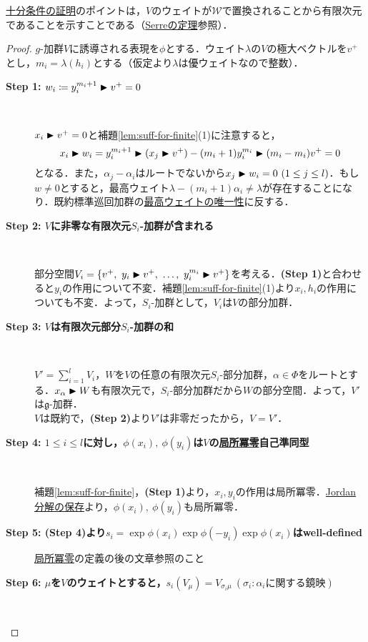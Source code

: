 \documentclass[rep_main]{subfiles}
\begin{document}
\hyperref[thm:suff-for-finite]{十分条件の証明}のポイントは，$V$のウェイトが$\mathscr{W}$で置換されることから有限次元であることを示すことである（\hyperref[thm:Serre]{Serreの定理}参照）．
\begin{proof}
	$g$-加群$V$に誘導される表現を$\phi$とする．ウェイト$\lambda$の$V$の極大ベクトルを$v^+$とし，$m_i = \lambda(h_i)$とする（仮定より$\lambda$は優ウェイトなので整数）．
	\begin{description}
		\item[\textbf{Step 1: $w_i \coloneqq y_i^{m_i + 1} \blacktriangleright v^+ = 0$}]　
		
		$x_i \blacktriangleright v^+ = 0$と補題\ref{lem:suff-for-finite}(1)に注意すると，
		\begin{equation}
			x_i \blacktriangleright w_i = y_i^{m_i + 1} \blacktriangleright (x_j \blacktriangleright v^+) - (m_i + 1)y_i^{m_i} \blacktriangleright (m_i - m_i)v^+ = 0
		\end{equation}
		となる．また，$\alpha_j - \alpha_i$はルートでないから$x_j \blacktriangleright w_i = 0\ (1 \leq j \leq l)$．もし$w \neq 0$とすると，最高ウェイト$\lambda - (m_i + 1)\alpha_i \neq \lambda$が存在することになり．既約標準巡回加群の\hyperref[col:standardcm]{最高ウェイトの唯一性}に反する．
		\item[\textbf{Step 2: $V$に非零な有限次元$S_i$-加群が含まれる}] 　
		
		部分空間$V_i = \{v^+,\ y_i \btr v^+,\ \ldots,\ y_i^{m_i}\btr v^+ \}$を考える．\textbf{(Step 1)}と合わせると$y_i$の作用について不変．補題\ref{lem:suff-for-finite}(1)より$x_i, h_i$の作用についても不変．よって，$S_i$-加群として，$V_i$は$V$の部分加群．
		\item[\textbf{Step 3: $V$は有限次元部分$S_i$-加群の和}] 　
		
		$V' = \sum_{i = 1}^l V_i$，$W$を$V$の任意の有限次元$S_i$-部分加群，$\alpha \in \Phi$をルートとする．$x_\alpha \blacktriangleright W$も有限次元で，$S_i$-部分加群だから$W$の部分空間．よって，$V'$は$\mathfrak{g}$-加群．\\
		$V$は既約で，\textbf{(Step 2)}より$V'$は非零だったから，$V = V'$．
		\item[\textbf{Step 4: $1 \leq i \leq l$に対し，$\phi(x_i),\ \phi(y_i)$は$V$の\hyperref[def:locally-nilpotent]{局所冪零}自己準同型}]　
		
		補題\ref{lem:suff-for-finite}，\textbf{(Step 1)}より，$x_i, y_i$の作用は局所冪零．\hyperref[col:JC]{Jordan分解の保存}より，$\phi(x_i),\ \phi(y_i)$も局所冪零．
		\item[\textbf{Step 5: (Step 4)より$s_i = \exp\phi(x_i)\exp\phi(-y_i)\exp\phi(x_i)$はwell-defined}] \hyperref[def:locally-nilpotent]{局所冪零}の定義の後の文章参照のこと
		\item[\textbf{Step 6: $\mu$を$V$のウェイトとすると，$s_i(V_\mu) = V_{\sigma_i\mu}\ (\sigma_i: \alpha_i\text{に関する鏡映})$}]　
		

\end{description}
\end{proof}
\end{document}
